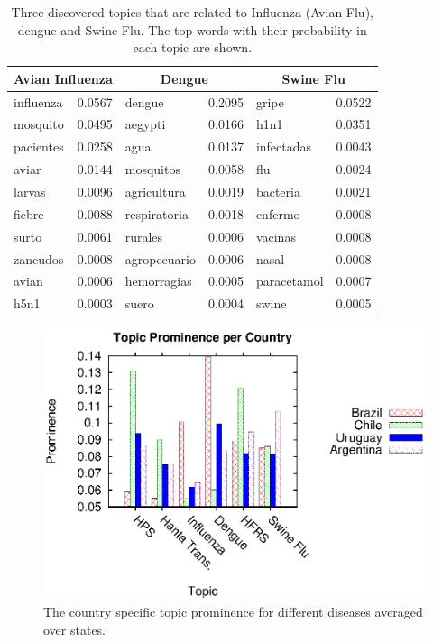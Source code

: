 \documentclass[twoside,leqno,twocolumn]{article}
\begin{document}
\begin{table}[t]
\scriptsize
\begin{center}
\caption{Three discovered topics that are related to Influenza (Avian Flu), dengue and Swine Flu. The top words with their probability in each topic are shown.}
\begin{tabular}{|lr|lr|lr|}
\hline
\multicolumn{2}{|c|}{\bf Avian Influenza} & \multicolumn{2}{|c|}{\bf Dengue} & 
\multicolumn{2}{|c|}{\bf Swine Flu} \\ \hline 
influenza & 0.0567 & dengue & 0.2095 & gripe & 0.0522 \\
mosquito & 0.0495 & aegypti & 0.0166 & h1n1 & 0.0351 \\
pacientes & 0.0258 & agua & 0.0137  & infectadas &0.0043 \\
aviar & 0.0144 & mosquitos & 0.0058  & flu & 0.0024\\
larvas & 0.0096 & agricultura & 0.0019 & bacteria & 0.0021 \\
fiebre & 0.0088 & respiratoria & 0.0018 & enfermo & 0.0008 \\
surto & 0.0061 & rurales & 0.0006 & vacinas & 0.0008 \\
zancudos & 0.0008 & agropecuario	 & 0.0006 & nasal & 0.0008 \\
avian & 0.0006 & hemorragias & 0.0005 & paracetamol & 0.0007 \\
h5n1 & 0.0003 & suero & 0.0004 & swine & 0.0005 \\
\hline
\end{tabular}\label{tab:common_topics}
\end{center}
\end{table}

\begin{figure}
\begin{center}
	\includegraphics[trim=5 0 10 10, clip,scale=0.7]{fig/country_topic.eps}
\end{center}
\caption{The country specific topic prominence for different diseases averaged over states.}
 \label{fig:country_topic}
\end{figure}
\end{document}
